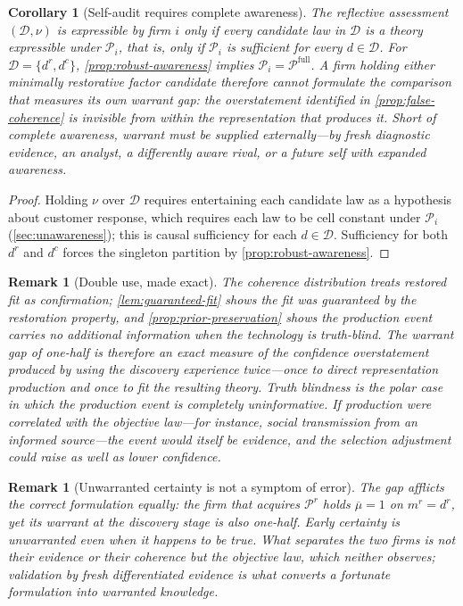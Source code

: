 \documentclass[11pt]{article}
\newtheorem{corollary}[assumption]{Corollary}
\newtheorem{remark}[assumption]{Remark}
\newcommand{\Prow}{\mathcal P^{r}}
\newcommand{\Pfull}{\mathcal P^{\mathrm{full}}}
\begin{document}
\begin{corollary}[Self-audit requires complete awareness]
\label{cor:self-audit}
The reflective assessment $(\mathcal D,\nu)$ is expressible by firm $i$ only
if every candidate law in $\mathcal D$ is a theory expressible under
$\mathcal P_i$, that is, only if $\mathcal P_i$ is sufficient for every
$d\in\mathcal D$.  For $\mathcal D=\{d^r,d^c\}$,
\cref{prop:robust-awareness} implies $\mathcal P_i=\Pfull$.  A firm holding
either minimally restorative factor candidate therefore cannot formulate the
comparison that measures its own warrant gap: the overstatement identified in
\cref{prop:false-coherence} is invisible from within the representation that
produces it.  Short of complete awareness, warrant must be supplied
externally---by fresh diagnostic evidence, an analyst, a differently aware
rival, or a future self with expanded awareness.
\end{corollary}

\begin{proof}
Holding $\nu$ over $\mathcal D$ requires entertaining each candidate law as a
hypothesis about customer response, which requires each law to be cell
constant under $\mathcal P_i$ (\cref{sec:unawareness}); this is causal
sufficiency for each $d\in\mathcal D$.  Sufficiency for both $d^r$ and $d^c$
forces the singleton partition by \cref{prop:robust-awareness}.
\end{proof}

\begin{remark}[Double use, made exact]
\label{rem:double-use}
The coherence distribution treats restored fit as confirmation;
\cref{lem:guaranteed-fit} shows the fit was guaranteed by the restoration
property, and \cref{prop:prior-preservation} shows the production event
carries no additional information when the technology is truth-blind.  The
warrant gap of one-half is therefore an exact measure of the confidence
overstatement produced by using the discovery experience twice---once to
direct representation production and once to fit the resulting theory.  Truth
blindness is the polar case in which the production event is completely
uninformative.  If production were correlated with the objective law---for
instance, social transmission from an informed source---the event would itself
be evidence, and the selection adjustment could raise as well as lower
confidence.
\end{remark}

\begin{remark}[Unwarranted certainty is not a symptom of error]
\label{rem:warranted-luck}
The gap afflicts the correct formulation equally: the firm that acquires
$\Prow$ holds $\overline\mu=1$ on $m^r=d^r$, yet its warrant at the discovery
stage is also one-half.  Early certainty is unwarranted even when it happens
to be true.  What separates the two firms is not their evidence or their
coherence but the objective law, which neither observes; validation by fresh
differentiated evidence is what converts a fortunate formulation into
warranted knowledge.
\end{remark}
\end{document}
